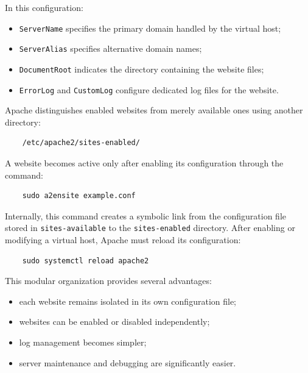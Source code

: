 \documentclass{scrbook}
\begin{document}
	In this configuration:
	\begin{itemize}
		\item
		\texttt{ServerName} specifies the primary domain handled by the virtual host;
		
		\item
		\texttt{ServerAlias} specifies alternative domain names;
		
		\item
		\texttt{DocumentRoot} indicates the directory containing the website files;
		
		\item
		\texttt{ErrorLog} and \texttt{CustomLog} configure dedicated log files for the website.
	\end{itemize}
	
	Apache distinguishes enabled websites from merely available ones using another directory:
	
	\begin{lstlisting}
	/etc/apache2/sites-enabled/
	\end{lstlisting}
	
	A website becomes active only after enabling its configuration through the command:
	
	\begin{lstlisting}
	sudo a2ensite example.conf
	\end{lstlisting}
	
	Internally, this command creates a symbolic link from the configuration file stored in \texttt{sites-available} to the \texttt{sites-enabled} directory. After enabling or modifying a virtual host, Apache must reload its configuration:
	
	\begin{lstlisting}
	sudo systemctl reload apache2
	\end{lstlisting}
	
	This modular organization provides several advantages:
	\begin{itemize}
		\item
		each website remains isolated in its own configuration file;
		
		\item
		websites can be enabled or disabled independently;
		
		\item
		log management becomes simpler;
		
		\item
		server maintenance and debugging are significantly easier.
	\end{itemize}
	
\end{document}
